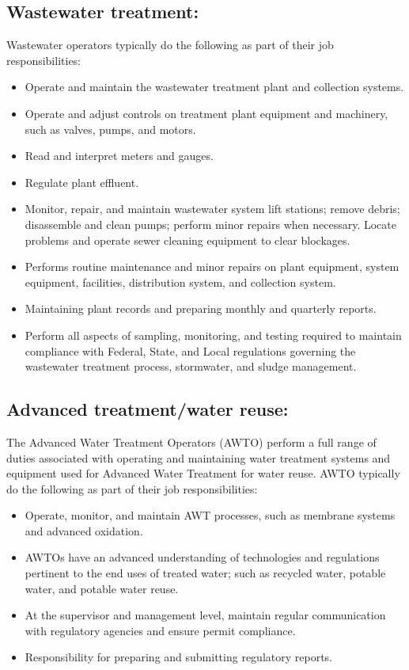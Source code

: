 \subsection{Wastewater treatment:}
Wastewater operators typically do the following as part of their job responsibilities:
\begin{itemize}
\item Operate and maintain the wastewater treatment plant and collection systems.
\item Operate and adjust controls on treatment plant equipment and machinery, such as valves, pumps, and motors. 
\item Read and interpret meters and gauges.
\item Regulate plant effluent.
\item Monitor, repair, and maintain wastewater system lift stations; remove debris; disassemble and clean pumps; perform minor repairs when necessary. Locate problems and operate sewer cleaning equipment to clear blockages.
\item Performs routine maintenance and minor repairs on plant equipment, system equipment,
facilities, distribution system, and collection system.
\item Maintaining plant records and preparing monthly and quarterly reports.
\item Perform all aspects of sampling, monitoring, and testing required to maintain compliance with Federal, State, and Local regulations governing the wastewater treatment process, stormwater, and sludge management.
\end{itemize}

\subsection{Advanced treatment/water reuse:}
The Advanced Water Treatment Operators (AWTO) perform a full range of duties associated with operating and maintaining water treatment systems and equipment used for Advanced Water Treatment for water reuse.
AWTO typically do the following as part of their job responsibilities:\\
\begin{itemize}
\item Operate, monitor, and maintain AWT processes, such as membrane systems and advanced oxidation.
\item AWTOs have an advanced understanding of technologies and regulations pertinent to the end uses of treated water; such as recycled water, potable water, and potable water reuse.
\item At the supervisor and management level, maintain regular communication with regulatory agencies and ensure permit compliance. 
\item Responsibility for preparing and submitting regulatory reports.
\end{itemize}
\newpage
